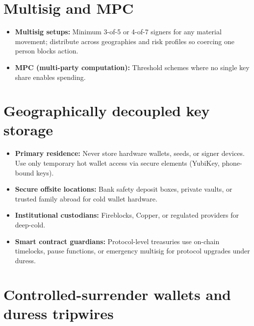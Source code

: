 \section{Multisig and MPC}\label{multisig-and-mpc}

\begin{itemize}
\tightlist
\item
  \textbf{Multisig setups:} Minimum 3-of-5 or 4-of-7 signers for any material movement; distribute across geographies and risk profiles so coercing one person blocks action.
\item
  \textbf{MPC (multi-party computation):} Threshold schemes where no single key share enables spending.
\end{itemize}

\section{Geographically decoupled key storage}\label{geographically-decoupled-key-storage}

\begin{itemize}
\tightlist
\item
  \textbf{Primary residence:} Never store hardware wallets, seeds, or signer devices. Use only temporary hot wallet access via secure elements (YubiKey, phone-bound keys).
\item
  \textbf{Secure offsite locations:} Bank safety deposit boxes, private vaults, or trusted family abroad for cold wallet hardware.
\item
  \textbf{Institutional custodians:} Fireblocks, Copper, or regulated providers for deep-cold.
\item
  \textbf{Smart contract guardians:} Protocol-level treasuries use on-chain timelocks, pause functions, or emergency multisig for protocol upgrades under duress.
\end{itemize}

\section{Controlled-surrender wallets and duress tripwires}\label{controlled-surrender-wallets-and-duress-tripwires}


